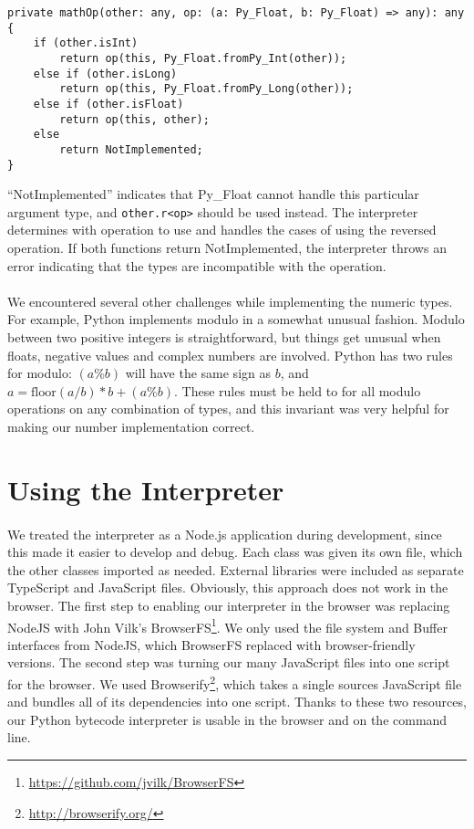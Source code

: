 \documentclass{article}
\begin{document}
\begin{verbatim}
private mathOp(other: any, op: (a: Py_Float, b: Py_Float) => any): any {
    if (other.isInt)
        return op(this, Py_Float.fromPy_Int(other));
    else if (other.isLong)
        return op(this, Py_Float.fromPy_Long(other));
    else if (other.isFloat)
        return op(this, other);
    else
        return NotImplemented;
}
\end{verbatim}

``NotImplemented'' indicates that Py\_Float cannot handle this particular argument type, and \texttt{other.r<op>} should be used instead. The interpreter determines with operation to use and handles the cases of using the reversed operation. If both functions return NotImplemented, the interpreter throws an error indicating that the types are incompatible with the operation.

\paragraph{}
We encountered several other challenges while implementing the numeric types. For example, Python implements modulo in a somewhat unusual fashion. Modulo between two positive integers is straightforward, but things get unusual when floats, negative values and complex numbers are involved. Python has two rules for modulo: $(a \% b)$ will have the same sign as $b$, and $a =  \mathrm{floor}(a / b) * b + (a \% b)$. These rules must be held to for all modulo operations on any combination of types, and this invariant was very helpful for making our number implementation correct.

\section{Using the Interpreter}\label{using interpreter}

\paragraph{}
We treated the interpreter as a Node.js application during development, since this made it easier to develop and debug. Each class was given its own file, which the other classes imported as needed. External libraries were included as separate TypeScript and JavaScript files. Obviously, this approach does not work in the browser. The first step to enabling our interpreter in the browser was replacing NodeJS with John Vilk's BrowserFS\footnote{\url{https://github.com/jvilk/BrowserFS}}. We only used the file system and Buffer interfaces from NodeJS, which BrowserFS replaced with browser-friendly versions. The second step was turning our many JavaScript files into one script for the browser. We used Browserify\footnote{\url{http://browserify.org/}}, which takes a single sources JavaScript file and bundles all of its dependencies into one script. Thanks to these two resources, our Python bytecode interpreter is usable in the browser and on the command line.
\end{document}
